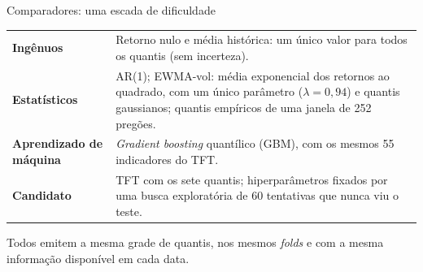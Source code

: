 \documentclass[aspectratio=169,10pt]{beamer}
\begin{document}
\begin{frame}{Comparadores: uma escada de dificuldade}
  \small
  \begin{tabular}{>{\raggedright\arraybackslash}p{}
                  >{\raggedright\arraybackslash}p{}}
    \toprule
    \textbf{Ingênuos} & Retorno nulo e média histórica: um único valor para todos
      os quantis (sem incerteza). \\
    \addlinespace
    \textbf{Estatísticos} & AR(1); \alert{EWMA-vol}: média exponencial dos retornos ao
      quadrado, com um único parâmetro (\(\lambda = 0{,}94\)) e quantis gaussianos;
      quantis empíricos de uma janela de 252 pregões. \\
    \addlinespace
    \textbf{Aprendizado de máquina} & \textit{Gradient boosting} quantílico (GBM),
      com os mesmos 55 indicadores do TFT. \\
    \addlinespace
    \textbf{Candidato} & TFT com os sete quantis; hiperparâmetros fixados por uma
      busca exploratória de 60 tentativas que nunca viu o teste. \\
    \bottomrule
  \end{tabular}

  \vspace{8pt}
  Todos emitem a mesma grade de quantis, nos mesmos \textit{folds} e com a mesma
  informação disponível em cada data.
\end{frame}
\end{document}
